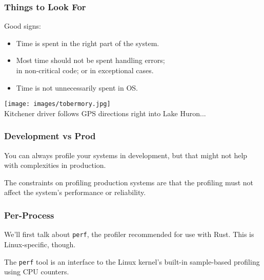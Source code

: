 \begin{frame}
  \frametitle{Things to Look For}


\begin{changemargin}{1.5cm}
  
    Good signs:\\[0em]

    \begin{itemize}
      \item Time is spent in the right part of the system.
      \item Most time should not be spent handling errors;\\
 in non-critical code; or in exceptional cases.
      \item Time is not unnecessarily spent in OS.
    \end{itemize}
    \end{changemargin}
    
    \begin{center}
	\texttt{[image: images/tobermory.jpg]}\\
	\hfill Kitchener driver follows GPS directions right into Lake Huron...
 	\end{center}
    
\end{frame}


\begin{frame}
\frametitle{Development vs Prod}

You can always profile your systems in development, but that might not
help with complexities in production. 

The constraints on profiling 
production systems are that the profiling must not affect the system's
performance or reliability.


\end{frame}


\begin{frame}
\frametitle{Per-Process}

 We'll first talk about {\tt perf}, the profiler 
recommended for use with Rust. This is Linux-specific, though.

The \texttt{perf} tool is an interface to the Linux kernel's built-in
sample-based profiling using CPU counters. 

\end{frame}


